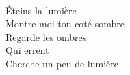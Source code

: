 \\
Éteins la lumière \\
Montre-moi ton coté sombre \\
Regarde les ombres \\
Qui errent \\
Cherche un peu de lumière \\
\\
